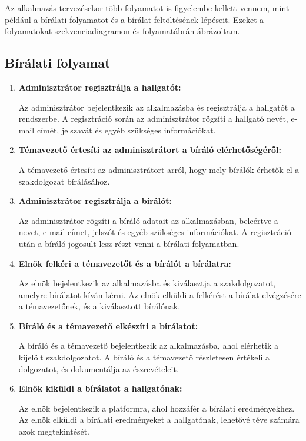 
Az alkalmazás tervezésekor több folyamatot is figyelembe kellett vennem, mint például a bírálati folyamatot és a bírálat feltöltésének lépéseit. Ezeket a folyamatokat szekvenciadiagramon és folyamatábrán ábrázoltam.

\subsection{Bírálati folyamat}

\vspace{0.5cm}

\begin{enumerate}
\item \textbf{Adminisztrátor regisztrálja a hallgatót:}

Az adminisztrátor bejelentkezik az alkalmazásba és regisztrálja a hallgatót a rendszerbe.
A regisztráció során az adminisztrátor rögzíti a hallgató nevét, e-mail címét, jelszavát és egyéb szükséges információkat.

\item \textbf{Témavezető értesíti az adminisztrátort a bíráló elérhetőségéről:}

A témavezető értesíti az adminisztrátort arról, hogy mely bírálók érhetők el a szakdolgozat bírálásához. 

\item \textbf{Adminisztrátor regisztrálja a bírálót:}

Az adminisztrátor rögzíti a bíráló adatait az alkalmazásban, beleértve a nevet, e-mail címet, jelszót és egyéb szükséges információkat. A regisztráció után a bíráló jogosult lesz részt venni a bírálati folyamatban.

\item \textbf{Elnök felkéri a témavezetőt és a bírálót a bírálatra:}

Az elnök bejelentkezik az alkalmazásba és kiválasztja a szakdolgozatot, amelyre bírálatot kíván kérni. Az elnök elküldi a felkérést a bírálat elvégzésére a témavezetőnek, és a kiválasztott bírálónak.

\item \textbf{Bíráló és a témavezető elkészíti a bírálatot:}

A bíráló és a témavezető bejelentkezik az alkalmazásba, ahol elérhetik a kijelölt szakdolgozatot. A bíráló és a témavezető részletesen értékeli a dolgozatot, és dokumentálja az észrevételeit.

\item \textbf{Elnök kiküldi a bírálatot a hallgatónak:}

Az elnök bejelentkezik a platformra, ahol hozzáfér a bírálati eredményekhez.
Az elnök elküldi a bírálati eredményeket a hallgatónak, lehetővé téve számára azok megtekintését.
\end{enumerate}


